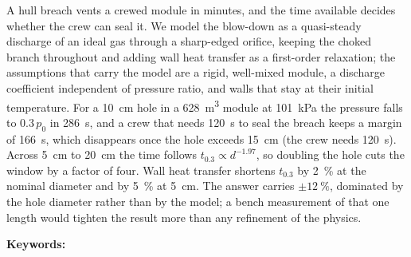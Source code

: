 \begin{titlepage}
{\setlength{\leftskip}{0.05\textwidth}%
 \setlength{\rightskip}{0.05\textwidth}%
 \setlength{\parindent}{0pt}%
A hull breach vents a crewed module in minutes, and the time available
decides whether the crew can seal it. We model the blow-down as a
quasi-steady discharge of an ideal gas through a sharp-edged orifice,
keeping the choked branch throughout and adding wall heat transfer as a
first-order relaxation; the assumptions that carry the model are a rigid,
well-mixed module, a discharge coefficient independent of pressure ratio,
and walls that stay at their initial temperature. For a \SI{10}{cm} hole
in a \SI{628}{m^3} module at \SI{101}{kPa} the pressure falls to
$0.3\,p_0$ in \SI{286}{s}, and a crew that needs \SI{120}{s} to seal the
breach keeps a margin of \SI{166}{s}, which disappears once the hole
exceeds \SI{15}{cm} (the crew needs \SI{120}{s}). Across \SI{5}{cm} to \SI{20}{cm} the time follows
$t_{0.3}\propto d^{-1.97}$, so doubling the hole cuts the window by a
factor of four. Wall heat transfer shortens $t_{0.3}$ by \SI{2}{\percent}
at the nominal diameter and by \SI{5}{\percent} at \SI{5}{cm}. The answer
carries $\pm\SI{12}{\percent}$, dominated by the hole diameter rather than
by the model; a bench measurement of that one length would tighten the
result more than any refinement of the physics.
\par}

\ifkeywords
  \vspace{1.0em}
  \begingroup
  \setlength{\leftskip}{0.05\textwidth}%
  \setlength{\rightskip}{0.05\textwidth}%
  \setlength{\parindent}{0pt}%
  \noindent\textbf{Keywords:}~\keywords\par
  \endgroup
\fi

\vfill
\end{titlepage}
\setcounter{page}{2}%
